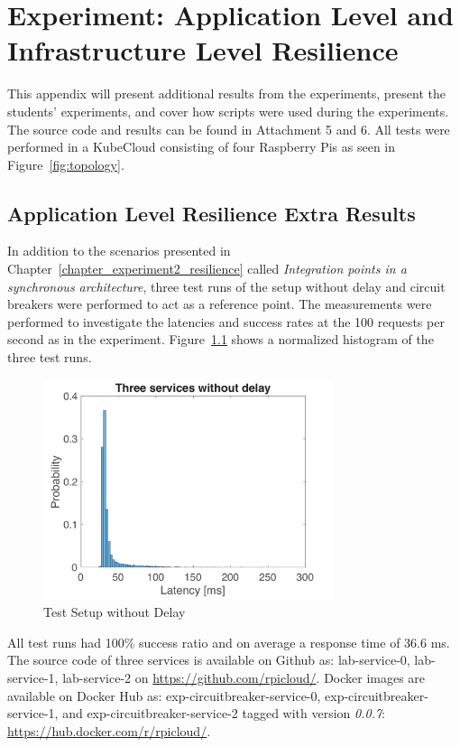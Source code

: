 \chapter{Experiment: Application Level and Infrastructure Level Resilience}
\label{appendix_resilience}

This appendix will present additional results from the experiments, present the students' experiments, and cover how scripts were used during the experiments. The source code and results can be found in Attachment 5 and 6. All tests were performed in a KubeCloud consisting of four Raspberry Pis as seen in Figure~\ref{fig:topology}.

\section*{Application Level Resilience Extra Results}
In addition to the scenarios presented in Chapter~\ref{chapter_experiment2_resilience} called \textit{Integration points in a synchronous architecture}, three test runs of the setup without delay and circuit breakers were performed to act as a reference point. The measurements were performed to investigate the latencies and success rates at the 100 requests per second as in the experiment. Figure~\ref{fig:appendix_no_delay} shows a normalized histogram of the three test runs.

\begin{figure}[H]
    \centering
    \includegraphics[width=8.5cm]{figures/appendix/no_delay}
    \caption{Test Setup without Delay}
    \label{fig:appendix_no_delay}
\end{figure}

\noindent
All test runs had 100\% success ratio and on average a response time of 36.6 ms. \\

\noindent
The source code of three services is available on Github as: lab-service-0, lab-service-1, lab-service-2 on \url{https://github.com/rpicloud/}. Docker images are available on Docker Hub as: exp-circuitbreaker-service-0, exp-circuitbreaker-service-1, and exp-circuitbreaker-service-2 tagged with version \textit{0.0.7}: \url{https://hub.docker.com/r/rpicloud/}.


